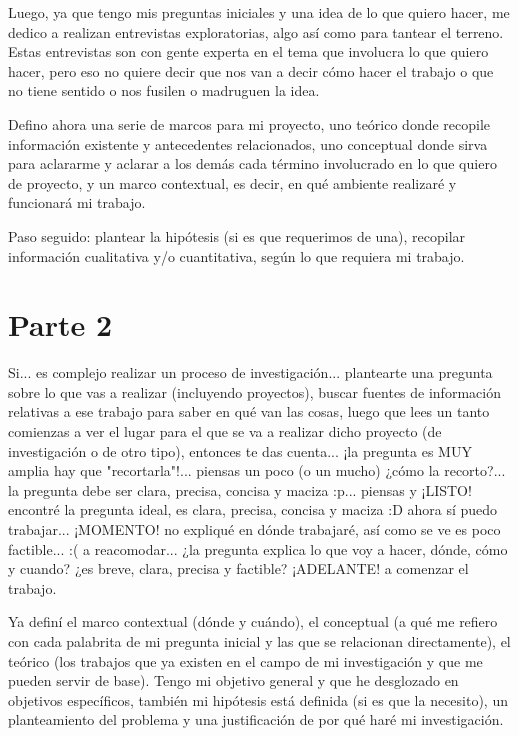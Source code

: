 Luego, ya que tengo mis preguntas iniciales y una idea de lo que quiero hacer, me dedico a realizan entrevistas exploratorias, algo así como para tantear el terreno. Estas entrevistas son con gente experta en el tema que involucra lo que quiero hacer, pero eso no quiere decir que nos van a decir cómo hacer el trabajo o que no tiene sentido o nos fusilen o madruguen la idea.

Defino ahora una serie de marcos para mi proyecto, uno teórico donde recopile información existente y antecedentes relacionados, uno conceptual donde sirva para aclararme y aclarar a los demás cada término involucrado en lo que quiero de proyecto, y un marco contextual, es decir, en qué ambiente realizaré y funcionará mi trabajo.

Paso seguido: plantear la hipótesis (si es que requerimos de una), recopilar información cualitativa y/o cuantitativa, según lo que requiera mi trabajo.

\section{Parte 2}
Si... es complejo realizar un proceso de investigación... plantearte una pregunta sobre lo que vas a realizar (incluyendo proyectos), buscar fuentes de información relativas a ese trabajo para saber en qué van las cosas, luego que lees un tanto comienzas a ver el lugar para el que se va a realizar dicho proyecto (de investigación o de otro tipo), entonces te das cuenta... ¡la pregunta es MUY amplia hay que "recortarla"!... piensas un poco (o un mucho) ¿cómo la recorto?... la pregunta debe ser clara, precisa, concisa y maciza :p... piensas y ¡LISTO! encontré la pregunta ideal, es clara, precisa, concisa y maciza :D ahora sí puedo trabajar... ¡MOMENTO! no expliqué en dónde trabajaré, así como se ve es poco factible... :( a reacomodar... ¿la pregunta explica lo que voy a hacer, dónde, cómo y cuando? ¿es breve, clara, precisa y factible? ¡ADELANTE! a comenzar el trabajo.

Ya definí el marco contextual (dónde y cuándo), el conceptual (a qué me refiero con cada palabrita de mi pregunta inicial y las que se relacionan directamente), el teórico (los trabajos que ya existen en el campo de mi investigación y que me pueden servir de base). Tengo mi objetivo general y que he desglozado en objetivos específicos, también mi hipótesis está definida (si es que la necesito), un planteamiento del problema y una justificación de por qué haré mi investigación.

